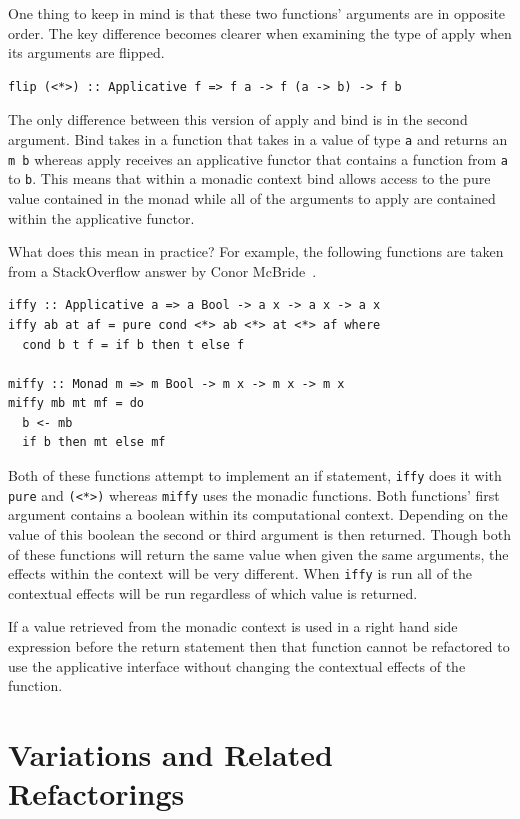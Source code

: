 One thing to keep in mind is that these two functions' arguments are in opposite order. The key difference becomes clearer when examining the type of apply when its arguments are flipped.

\begin{lstlisting}[frame=tblr]
flip (<*>) :: Applicative f => f a -> f (a -> b) -> f b
\end{lstlisting}

The only difference between this version of apply and bind is in the second argument. Bind takes in a function that takes in a value of type \texttt{a} and returns an \texttt{m b} whereas apply receives an applicative functor that contains a function from \texttt{a} to \texttt{b}. This means that within a monadic context bind allows access to the pure value contained in the monad while all of the arguments to apply are contained within the applicative functor.

What does this mean in practice? For example, the following functions are taken from a StackOverflow answer by Conor McBride~\citep{soApp}.

\begin{lstlisting}[frame=tblr]
iffy :: Applicative a => a Bool -> a x -> a x -> a x
iffy ab at af = pure cond <*> ab <*> at <*> af where
  cond b t f = if b then t else f

miffy :: Monad m => m Bool -> m x -> m x -> m x
miffy mb mt mf = do
  b <- mb
  if b then mt else mf
\end{lstlisting} 

Both of these functions attempt to implement an if statement, \texttt{iffy} does it with \texttt{pure} and \texttt{(<*>)} whereas \texttt{miffy} uses the monadic functions. Both functions' first argument contains a boolean within its computational context. Depending on the value of this boolean the second or third argument is then returned. Though both of these functions will return the same value when given the same arguments, the effects within the context will be very different. When \texttt{iffy} is run all of the contextual effects will be run regardless of which value is returned.

If a value retrieved from the monadic context is used in a right hand side expression before the return statement then that function cannot be refactored to use the applicative interface without changing the contextual effects of the function. 

\section{Variations and Related Refactorings}
\label{sec:appVariations}

